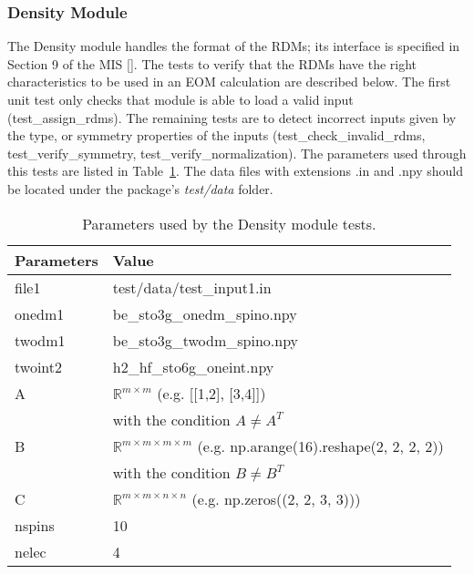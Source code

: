 \documentclass[12pt, titlepage]{article}
\begin{document}
\subsubsection{Density Module}
\label{sec:M5}

The Density module handles the format of the RDMs; its interface is specified in
Section 9 of the MIS [\cite{MIS2020}]. The tests to verify that the RDMs have 
the right characteristics to be used in an EOM calculation are described below. 
The first unit test only checks that module is able to load a valid input
(test\_assign\_rdms). The remaining tests are to detect incorrect inputs given 
by the type, or symmetry properties of the inputs (test\_check\_invalid\_rdms, 
test\_verify\_symmetry, test\_verify\_normalization). The parameters 
used through this tests are listed in Table~\ref{table:dmdata}.
The data files with extensions .in and .npy should be located under the 
package's \textit{test/data} folder.
\begin{table}[h!]
	\centering
	\begin{tabular}{ll}
		Parameters& Value\\
		\midrule 
		file1 & test/data/test\_input1.in\\
		onedm1 & be\_sto3g\_onedm\_spino.npy\\
		twodm1 & be\_sto3g\_twodm\_spino.npy\\
		twoint2 & h2\_hf\_sto6g\_oneint.npy\\
		A &$\mathbb{R}^{m \times m}$ (e.g. [[1,2], [3,4]])\\
		&with the condition $A \not= A^{T}$\\
		B &$\mathbb{R}^{m \times m \times m \times m}$ (e.g. 
		np.arange(16).reshape(2, 
		2, 2, 2))\\
		&with the condition $B \not= B^{T}$\\
		C &$\mathbb{R}^{m \times m \times n \times n}$ (e.g. 
		np.zeros((2, 2, 3, 3)))\\
		nspins&10\\
		nelec&4\\
		\bottomrule
	\end{tabular}
	\caption{Parameters used by the Density module tests.}
	\label{table:dmdata}
\end{table}
\end{document}
